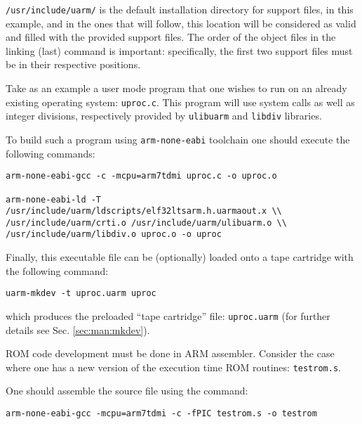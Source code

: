 \texttt{/usr/include/uarm/} is the default installation directory for support files, in this example, and in the ones that will follow, this location will be considered as valid and filled with the provided support files.
The order of the object files in the linking (last) command is important: specifically, the first two support files must be in their respective positions.

Take as an example a user mode program that one wishes to run on an already existing \uarm{} operating system: \texttt{uproc.c}.
This program will use system calls as well as integer divisions, respectively provided by \texttt{ulibuarm} and \texttt{libdiv} libraries.

To build such a program using \texttt{arm-none-eabi} toolchain one should execute the following commands:\\
\begin{minipage}{\textwidth}
\begin{lstlisting}
arm-none-eabi-gcc -c -mcpu=arm7tdmi uproc.c -o uproc.o

arm-none-eabi-ld -T 
/usr/include/uarm/ldscripts/elf32ltsarm.h.uarmaout.x \\
/usr/include/uarm/crti.o /usr/include/uarm/ulibuarm.o \\
/usr/include/uarm/libdiv.o uproc.o -o uproc
\end{lstlisting}
\end{minipage}

Finally, this executable file can be (optionally) loaded onto a tape cartridge with the following command:

\noindent
\begin{lstlisting}
uarm-mkdev -t uproc.uarm uproc
\end{lstlisting}

\noindent
which produces the preloaded “tape cartridge” file: \texttt{uproc.uarm} (for further details see Sec. \ref{sec:man:mkdev}).


ROM code development must be done in ARM assembler. 
Consider the case where one has a new version of the execution time ROM routines: \texttt{testrom.s}.

One should assemble the source file using the command:\\
\begin{lstlisting}
arm-none-eabi-gcc -mcpu=arm7tdmi -c -fPIC testrom.s -o testrom
\end{lstlisting}

